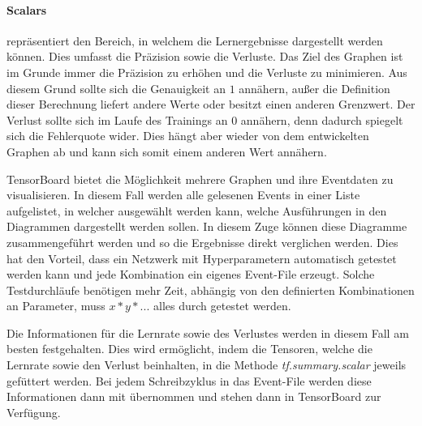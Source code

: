 \paragraph{Scalars} repräsentiert den Bereich, in welchem die Lernergebnisse dargestellt werden können. 
Dies umfasst die Präzision sowie die Verluste. 
Das Ziel des Graphen ist im Grunde immer die Präzision zu erhöhen und die Verluste zu minimieren. 
Aus diesem Grund sollte sich die Genauigkeit an $1$ annähern, außer die Definition dieser Berechnung liefert andere Werte oder besitzt einen anderen Grenzwert. 
Der Verlust sollte sich im Laufe des Trainings an $0$ annähern, denn dadurch spiegelt sich die Fehlerquote wider. 
Dies hängt aber wieder von dem entwickelten Graphen ab und kann sich somit einem anderen Wert annähern.
\phantom \newline

\noindent
TensorBoard bietet die Möglichkeit mehrere Graphen und ihre Eventdaten zu visualisieren. 
In diesem Fall werden alle gelesenen Events in einer Liste aufgelistet, in welcher ausgewählt werden kann, welche Ausführungen in den Diagrammen dargestellt werden sollen. 
In diesem Zuge können diese Diagramme zusammengeführt werden und so die Ergebnisse direkt verglichen werden. 
Dies hat den Vorteil, dass ein Netzwerk mit Hyperparametern automatisch getestet werden kann und jede Kombination ein eigenes Event-File erzeugt. 
Solche Testdurchläufe benötigen mehr Zeit, abhängig von den definierten Kombinationen an Parameter, muss $x * y * ...$ alles durch getestet werden.
\phantom \newline

\noindent
Die Informationen für die Lernrate sowie des Verlustes werden in diesem Fall am besten festgehalten. 
Dies wird ermöglicht, indem die Tensoren, welche die Lernrate sowie den Verlust beinhalten, in die Methode \textit{tf.summary.scalar} jeweils gefüttert werden. 
Bei jedem Schreibzyklus in das Event-File werden diese Informationen dann mit übernommen und stehen dann in TensorBoard zur Verfügung.

